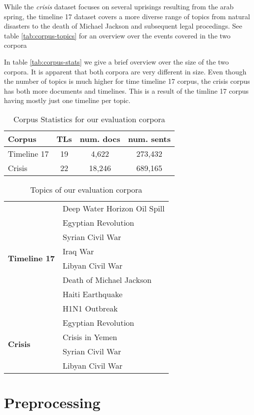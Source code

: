 \documentclass[a4paper,BCOR=10mm]{report}
\numberwithin{lemma}{chapter}
\numberwithin{definition}{chapter}
\begin{document}
While the \textit{crisis} dataset focuses on several uprisings resulting from the arab spring, the timeline 17 dataset covers a more diverse range of topics from natural disasters to the death of Michael Jackson and subsequent legal procedings. See table \ref{tab:corpus-topics} for an overview over the events covered in the two corpora

In table \ref{tab:corpus-stats} we give a brief overview over the size of the two corpora. It is apparent that both corpora are very different in size. Even though the number of topics is much higher for time timeline 17 corpus, the crisis corpus has both more documents and timelines. This is a result of the timline 17 corpus having mostly just one timeline per topic.

\begin{table}
\begin{tabular}{|l|ccc|}
\hline
Corpus &TLs & num. docs & num. sents \\\hline
Timeline 17 & 19 & 4,622 & 273,432 \\
Crisis & 22 & 18,246 & 689,165 \\\hline
\end{tabular}
\caption{Corpus Statistics for our evaluation corpora}
\end{table}

\begin{table}
\begin{tabular}{|l|l|}
\hline
\multirow{8}{*}{\textbf{Timeline 17}} & Deep Water Horizon Oil Spill \\
& Egyptian Revolution \\
& Syrian Civil War \\
& Iraq War \\
& Libyan Civil War \\
& Death of Michael Jackson \\
& Haiti Earthquake \\
& H1N1 Outbreak \\\hline\hline
\multirow{4}{*}{\textbf{Crisis}} & Egyptian Revolution \\
& Crisis in Yemen \\
& Syrian Civil War \\
& Libyan Civil War \\\hline
\end{tabular}
\caption{Topics of our evaluation corpora}
\end{table}

\section{Preprocessing}
\end{document}
